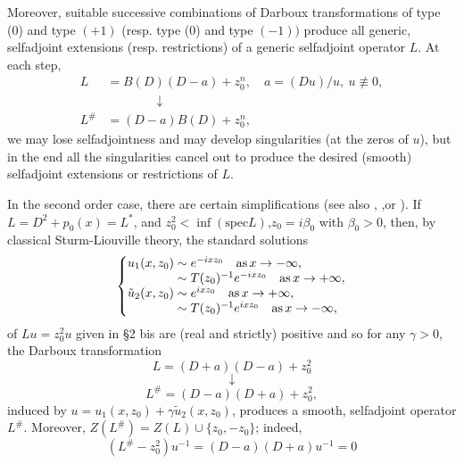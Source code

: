 \documentclass{surv-l}
\theoremstyle{plain}
\theoremstyle{definition}
\numberwithin{equation}{chapter}
\begin{document}
Moreover, suitable successive combinations of Darboux transformations of type (0) and type $(+1)$ (resp. type (0) and type $(-1) )$ produce all generic, selfadjoint extensions (resp. restrictions) of a generic selfadjoint operator $L$. At each step,
\begin{align*}
L &=B(D)(D-a)+z_{0}^{n},\quad a=(Du)/u,\ u\not\equiv 0,\\
&\qquad\quad\quad\downarrow\\
L^{\#}&=(D-a)B(D)+z_{0}^{n},
\end{align*}
we may lose selfadjointness and may develop singularities (at the zeros of $u$), but in the end all the singularities cancel out to produce the desired (smooth) selfadjoint extensions or restrictions of $L$.

In the second order case, there are certain simplifications (see also \cite{De}, \cite{DT},or \cite{Fa2}). If $L=D^{2}+p_{0}(x)=L^{*}$, and $z_{0}^{2}<\displaystyle \inf(\mathrm{spec} L)$,$ z_{0}=i\beta_{0}$ with $\beta_{0}>0$, then, by classical Sturm-Liouville theory, the standard solutions
\begin{align}\label{eq37.16}
\left\{
\begin{array}{@{}l@{}}
u_{1}(x, z_{0})\sim e^{-ixz_{0}}\quad \mathrm{as}\, x\rightarrow -\infty,\\
\qquad\qquad\sim T(z_{0})^{-1}e^{-ixz_{0}}\quad \mathrm{as}\, x\rightarrow +\infty,\\
\tilde{u}_{2}(x,z_{0})\sim e^{ixz_{0}}\quad \mathrm{as}\, x\rightarrow +\infty,\\
\qquad\qquad\sim T(z_{0})^{-1}e^{ixz_{0}}\quad \mathrm{as}\, x\rightarrow -\infty,
\end{array}\right.
\end{align}
of $Lu=z_{0}^{2}u$ given in \S 2 bis are (real and strictly) positive and so for any $\gamma>0$, the Darboux transformation
\begin{equation*}
L=(D+a)(D-a)+z_{0}^{2}
\end{equation*}
\begin{equation*}
\downarrow
\end{equation*}
\begin{equation*}
L^{\#}=(D-a)(D+a)+z_{0}^{2},
\end{equation*}
induced by $u=u_{1}(x,z_{0})+\gamma\tilde{u}_{2}(x,z_{0})$, produces a smooth, selfadjoint operator $L^{\#}$. Moreover, $Z(L^{\#})=Z(L)\cup\{z_{0},-z_{0}\}$; indeed,
\begin{equation*}
(L^{\#}-z_{0}^{2})u^{-1}=(D-a)(D+a)u^{-1}=0
\end{equation*}
\end{document}
